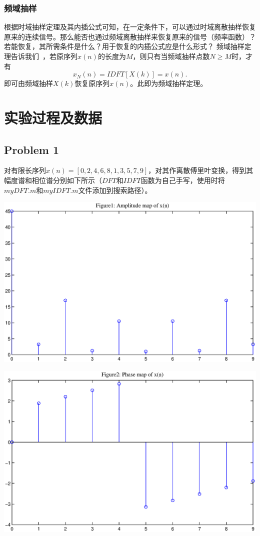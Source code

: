 \documentclass[a4paper,11pt,onecolumn,twoside]{article}
\begin{document}
\subsubsection{频域抽样}
根据时域抽样定理及其内插公式可知，在一定条件下，可以通过时域离散抽样恢复原来的连续信号。那么能否也通过频域离散抽样来恢复原来的信号（频率函数）？若能恢复，其所需条件是什么？用于恢复的内插公式应是什么形式？
频域抽样定理告诉我们~\supercite{course1}，若原序列$x(n)$的长度为$M$，则只有当频域抽样点数$N\geq M$时，才有
\begin{equation}
x_{N}(n) = IDFT[X(k)] = x(n).
\end{equation}
即可由频域抽样$X(k)$恢复原序列$x(n)$。此即为频域抽样定理。



\section{实验过程及数据}

\subsection{Problem 1}
对有限长序列$x(n) = [0,2,4,6,8,1,3,5,7,9]$，对其作离散傅里叶变换，得到其幅度谱和相位谱分别如下所示（$DFT$和$IDFT$函数为自己手写，使用时将$myDFT.m$和$myIDFT.m$文件添加到搜索路径）。

\begin{center}
    \includegraphics[width=1\textwidth]{fig1.eps}
\end{center}
\begin{center}
    \includegraphics[width=1\textwidth]{fig2.eps}
\end{center}
\end{document}
